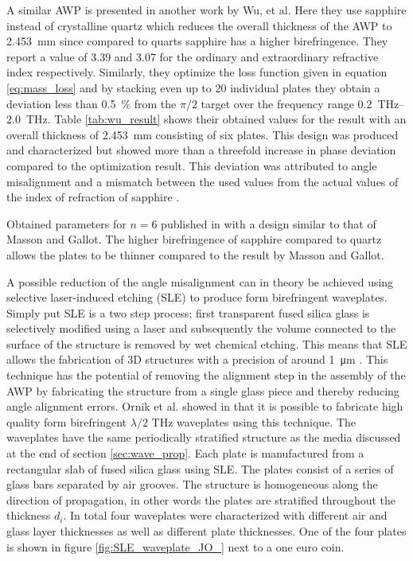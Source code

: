 A similar AWP is presented in another work by Wu, et al. Here they use sapphire instead of crystalline quartz which reduces the overall thickness of the AWP to \SI{2.453}{\milli \meter} since compared to quarts sapphire has a higher birefringence. They report a value of 3.39 and 3.07 for the ordinary and extraordinary refractive index respectively. Similarly, they optimize the loss function given in equation \ref{eq:mass_loss} and by stacking even up to 20 individual plates they obtain a deviation less than \SI{0.5}{\percent} from the $\pi/2$ target over the frequency range \SIrange{0.2}{2.0}{\tera \hertz}. Table \ref{tab:wu_result} shows their obtained values for the result with an overall thickness of \SI{2.453}{\milli \meter} consisting of six plates. This design was produced and characterized but showed more than a threefold increase in phase deviation compared to the optimization result. This deviation was attributed to angle misalignment and a mismatch between the used values from the actual values of the index of refraction of sapphire \cite{Wu2020}. 

\begin{table}[h]
    \centering
    
    \caption{Obtained parameters for $n=6$ published in \cite{Wu2020} with a design similar to that of Masson and Gallot. The higher birefringence of sapphire compared to quartz allows the plates to be thinner compared to the result by Masson and Gallot.}
    \label{tab:wu_result}
\end{table}

A possible reduction of the angle misalignment can in theory be achieved using selective laser-induced etching (SLE) to produce form birefringent waveplates. Simply put SLE is a two step process; first transparent fused silica glass is selectively modified using a laser and subsequently the volume connected to the surface of the structure is removed by wet chemical etching. This means that SLE allows the fabrication of 3D structures with a precision of around \SI{1}{\micro \meter} \cite{Hermans2014}. This technique has the potential of removing the alignment step in the assembly of the AWP by fabricating the structure from a single glass piece and thereby reducing angle alignment errors. Ornik et al. showed in \cite{Ornik2018} that it is possible to fabricate high quality form birefringent $\lambda/2$ THz waveplates using this technique. The waveplates have the same periodically stratified structure as the media discussed at the end of section \ref{sec:wave_prop}. Each plate is manufactured from a rectangular slab of fused silica glass using SLE. The plates consist of a series of glass bars separated by air grooves. The structure is homogeneous along the direction of propagation, in other words the plates are stratified throughout the thickness $d_i$. In total four waveplates were characterized with different air and glass layer thicknesses as well as different plate thicknesses. One of the four plates is shown in figure \ref{fig:SLE_waveplate_JO_} next to a one euro coin.

